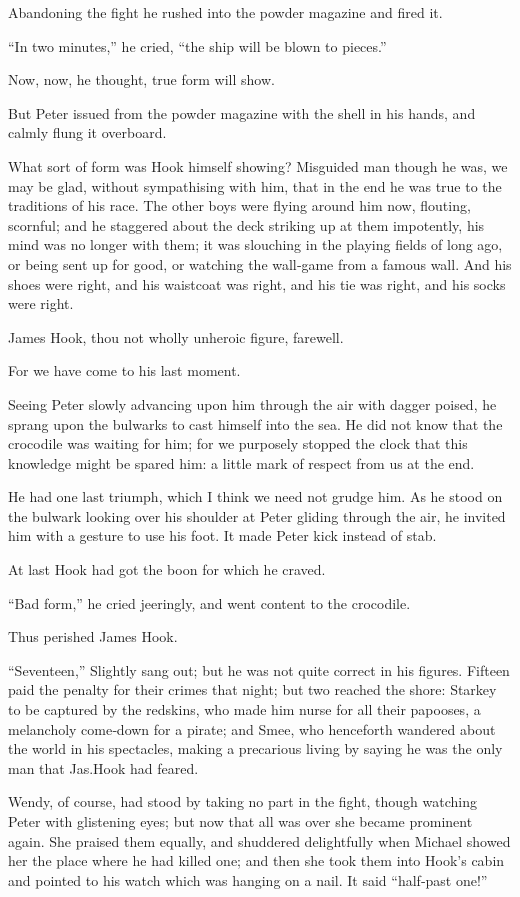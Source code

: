 Abandoning the fight he rushed into the powder magazine and fired it.

“In two minutes,” he cried, “the ship will be blown to pieces.”

Now, now, he thought, true form will show.

But Peter issued from the powder magazine with the shell in his hands,
and calmly flung it overboard.

What sort of form was Hook himself showing?
Misguided man though he was,
we may be glad, without sympathising with him,
that in the end he was true to the traditions of his race.
The other boys were flying around him now, flouting, scornful;
and he staggered about the deck striking up at them impotently,
his mind was no longer with them;
it was slouching in the playing fields of long ago, or being sent up for good,
or watching the wall‐game from a famous wall.
And his shoes were right, and his waistcoat was right, and his tie was right, and his socks were right.

James Hook, thou not wholly unheroic figure, farewell.

For we have come to his last moment.

Seeing Peter slowly advancing upon him through the air with dagger poised,
he sprang upon the bulwarks to cast himself into the sea.
He did not know that the crocodile was waiting for him;
for we purposely stopped the clock that this knowledge might be spared him:
a little mark of respect from us at the end.

He had one last triumph, which I think we need not grudge him.
As he stood on the bulwark looking over his shoulder at Peter gliding through the air,
he invited him with a gesture to use his foot.
It made Peter kick instead of stab.

At last Hook had got the boon for which he craved.

“Bad form,” he cried jeeringly, and went content to the crocodile.

Thus perished James Hook.

“Seventeen,” Slightly sang out;
but he was not quite correct in his figures.
Fifteen paid the penalty for their crimes that night;
but two reached the shore:
Starkey to be captured by the redskins,
who made him nurse for all their papooses, a melancholy come‐down for a pirate;
and Smee, who henceforth wandered about the world in his spectacles,
making a precarious living by saying he was the only man that Jas.\@ Hook had feared.

Wendy, of course, had stood by taking no part in the fight,
though watching Peter with glistening eyes;
but now that all was over she became prominent again.
She praised them equally, and shuddered delightfully when Michael showed her the place where he had killed one;
and then she took them into Hook’s cabin and pointed to his watch which was hanging on a nail.
It said “half‐past one!”

